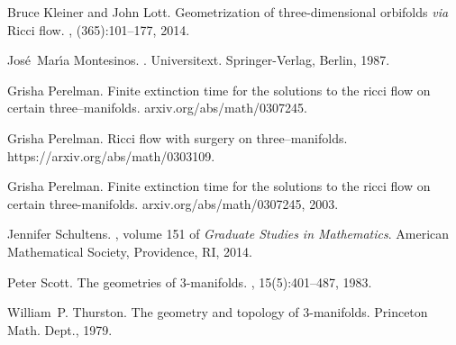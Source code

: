 \documentclass[12pt,reqno]{amsart}
\theoremstyle{plain}
\theoremstyle{definition}
\numberwithin{subcase}{case}
\theoremstyle{plain}
\theoremstyle{definition}
\begin{document}
\begin{thebibliography}{10}
Bruce Kleiner and John Lott.
\newblock Geometrization of three-dimensional orbifolds {\it via} {R}icci flow.
, (365):101--177, 2014.

Jos\'{e}~Mar\'{\i}a Montesinos.
.
\newblock Universitext. Springer-Verlag, Berlin, 1987.

Grisha Perelman.
\newblock Finite extinction time for the solutions to the ricci flow on certain
  three--manifolds.
\newblock arxiv.org/abs/math/0307245.

Grisha Perelman.
\newblock Ricci flow with surgery on three--manifolds.
\newblock https://arxiv.org/abs/math/0303109.

Grisha Perelman.
\newblock Finite extinction time for the solutions to the ricci flow on certain
  three-manifolds.
\newblock arxiv.org/abs/math/0307245, 2003.

Jennifer Schultens.
, volume 151 of {\em Graduate
  Studies in Mathematics}.
\newblock American Mathematical Society, Providence, RI, 2014.

Peter Scott.
\newblock The geometries of {$3$}-manifolds.
, 15(5):401--487, 1983.

William~P. Thurston.
\newblock The geometry and topology of 3-manifolds.
\newblock Princeton Math. Dept., 1979.

\end{thebibliography}
\end{document}
